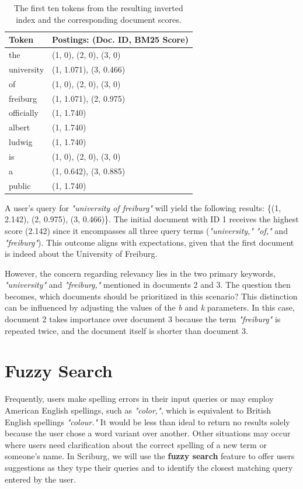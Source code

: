 \begin{table}[ht] 
\centering
{\footnotesize
\begin{tabular}{ |P{2.5cm}|P{9.9cm}|  }
 \hline 
\textbf{Token} & \textbf{Postings: (Doc. ID, BM25 Score)}\T\B 
\\ 
\hline
the & (1, 0), (2, 0), (3, 0) \T\B 
\\ 
\hline
university &  (1, 1.071), (3, 0.466) \T\B 
\\ 
\hline
of  &  (1, 0), (2, 0), (3, 0) \T\B 
\\
\hline
freiburg  &  (1, 1.071), (2, 0.975) \T\B 
\\ 
\hline
officially  &  (1, 1.740) \T\B 
\\ 
\hline
albert  & (1, 1.740)\T\B 
\\ 
\hline
ludwig  &  (1, 1.740) \T\B 
\\ 
\hline
is  & (1, 0), (2, 0), (3, 0) \T\B 
\\ 
\hline
a  & (1, 0.642), (3, 0.885) \T\B 
\\ 
\hline
public  &  (1, 1.740) \T\B 
\\ 
\hline
    \end{tabular}
}
  \captionsetup{justification=centering,margin=2cm}
  \caption{The first ten tokens from the resulting inverted index and the corresponding document scores. }
  \label{table:bm25-result}
\end{table}

A user's query for \textit{"university of freiburg"} will yield the following results: \{(1, 2.142), (2, 0.975), (3, 0.466)\}. The initial document with ID 1 receives the highest score (2.142) since it encompasses all three query terms (\textit{"university,"} \textit{"of,"} and \textit{"freiburg"}). This outcome aligns with expectations, given that the first document is indeed about the University of Freiburg.

However, the concern regarding relevancy lies in the two primary keywords, \textit{"university"} and \textit{"freiburg,"} mentioned in documents 2 and 3. The question then becomes, which documents should be prioritized in this scenario? This distinction can be influenced by adjusting the values of the \textit{b} and \textit{k} parameters. In this case, document 2 takes importance over document 3 because the term \textit{"freiburg"} is repeated twice, and the document itself is shorter than document 3.


\section{Fuzzy Search}
Frequently, users make spelling errors in their input queries or may employ American English spellings, such as \textit{"color,"}, which is equivalent to British English spellings \textit{"colour."} It would be less than ideal to return no results solely because the user chose a word variant over another. Other situations may occur where users need clarification about the correct spelling of a new term or someone's name. In Scriburg, we will use the \textbf{fuzzy search} feature to offer users suggestions as they type their queries and to identify the closest matching query entered by the user.

